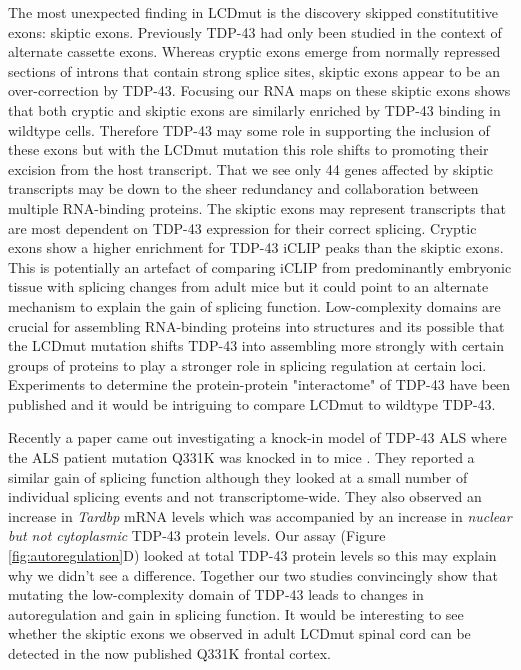 The most unexpected finding in LCDmut is the discovery skipped constitutitive exons: skiptic exons. 
Previously TDP-43 had only been studied in the context of alternate cassette exons.
Whereas cryptic exons emerge from normally repressed sections of introns that contain strong splice sites, skiptic exons appear to be an over-correction by TDP-43.
Focusing our RNA maps on these skiptic exons shows that both cryptic and skiptic exons are similarly enriched by TDP-43 binding in wildtype cells.
Therefore TDP-43 may some role in supporting the inclusion of these exons but with the LCDmut mutation this role shifts to promoting their excision from the host transcript.
That we see only 44 genes affected by skiptic transcripts may be down to the sheer redundancy and collaboration between multiple RNA-binding proteins. 
The skiptic exons may represent transcripts that are most dependent on TDP-43 expression for their correct splicing. 
Cryptic exons show a higher enrichment for TDP-43 iCLIP peaks than the skiptic exons. 
This is potentially an artefact of comparing iCLIP from predominantly embryonic tissue with splicing changes from adult mice but it could point to an alternate mechanism to explain the gain of splicing function.
Low-complexity domains are crucial for assembling RNA-binding proteins into structures  \cite{Gueroussov2017} and its possible that the LCDmut mutation shifts TDP-43 into assembling more strongly with certain groups of proteins to play a stronger role in splicing regulation at certain loci. 
Experiments to determine the protein-protein "interactome" of TDP-43 have been published \citep{Freibaum2010-hw} and it would be intriguing to compare LCDmut to wildtype TDP-43. 

Recently a paper came out investigating a knock-in model of TDP-43 ALS where the ALS patient mutation Q331K was knocked in to mice \citep{White2018}. 
They reported a similar gain of splicing function although they looked at a small number of individual splicing events and not transcriptome-wide.
They also observed an increase in \textit{Tardbp} mRNA levels which was accompanied by an increase in \textit{nuclear but not cytoplasmic} TDP-43 protein levels.
Our assay (Figure \ref{fig:autoregulation}D) looked at total TDP-43 protein levels so this may explain why we didn't see a difference. 
Together our two studies convincingly show that mutating the low-complexity domain of TDP-43 leads to changes in autoregulation and gain in splicing function.
It would be interesting to see whether the skiptic exons we observed in adult LCDmut spinal cord can be detected in the now published Q331K frontal cortex.
 
